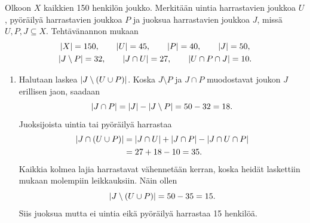 \documentclass[11pt,a4paper]{amsart}
\begin{document}
\begin{solution}
Olkoon \(X\) kaikkien 150 henkilön joukko. Merkitään uintia harrastavien
joukkoa \(U\), pyöräilyä harrastavien joukkoa \(P\) ja juoksua harrastavien
joukkoa \(J\), missä \(U,P,J \subseteq X\). Tehtävänannon mukaan
\[
  \begin{gathered}
    \lvert X\rvert=150, \qquad \lvert U\rvert=45, \qquad \lvert P\rvert=40, \qquad \lvert J\rvert=50, \\
    \lvert J\setminus P\rvert=32, \qquad \lvert J\cap U\rvert=27, \qquad
    \lvert U\cap P\cap J\rvert=10.
  \end{gathered}
\]
\begin{enumerate}[label=\alph*), nosep]
\item Halutaan laskea \(\lvert J\setminus(U\cup P)\rvert\).
  Koska \(J\setminus P\) ja \(J\cap P\) muodostavat joukon \(J\)
  erillisen jaon, saadaan
  \[
    \lvert J\cap P\rvert=\lvert J\rvert-\lvert J\setminus P\rvert=50-32=18.
  \]
  Juoksijoista uintia tai pyöräilyä harrastaa
  \[
    \begin{aligned}
      \lvert J\cap(U\cup P)\rvert
      &=\lvert J\cap U\rvert+\lvert J\cap P\rvert-\lvert J\cap U\cap P\rvert \\
      &=27+18-10=35.
    \end{aligned}
  \]
  Kaikkia kolmea lajia harrastavat vähennetään kerran, koska heidät
  laskettiin mukaan molempiin leikkauksiin. Näin ollen
  \[
    \lvert J\setminus(U\cup P)\rvert=50-35=15.
  \]
  Siis juoksua mutta ei uintia eikä pyöräilyä harrastaa 15 henkilöä.

  \begin{center}


\end{center}
\end{enumerate}
\end{solution}
\end{document}
